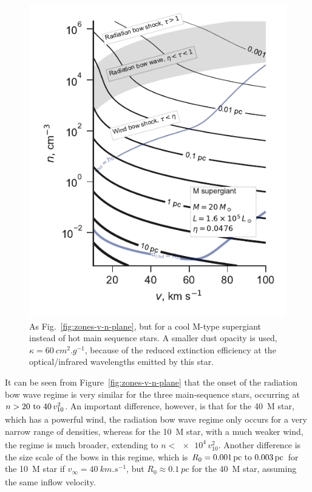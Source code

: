 \begin{figure}
  \includegraphics[width=\linewidth]{figs/zones-v-n-plane-RSG}
  \caption{As Fig.~\ref{fig:zones-v-n-plane}, but for a cool M-type
    supergiant instead of hot main sequence stars.  A smaller dust
    opacity is used, \(\kappa = \SI{60}{cm^2.g^{-1}}\), because of the
    reduced extinction efficiency at the optical/infrared wavelengths
    emitted by this star.}
  \label{fig:M-supergiant}
\end{figure}

It can be seen from Figure~\ref{fig:zones-v-n-plane} that the onset of
the radiation bow wave regime is very similar for the three
main-sequence stars, occurring at
\(n > \text{\numrange{20}{40}} \, v_{10}^2\).  An important
difference, however, is that for the \SI{40}{M_\odot} star, which has a
powerful wind, the radiation bow wave regime only occurs for a very
narrow range of densities, whereas for the \SI{10}{M_\odot} star, with a
much weaker wind, the regime is much broader, extending to
\(n < \num{e4} \, v_{10}^2\).  Another difference is the size scale of
the bows in this regime, which is
\(R_0 = \text{\SIrange{0.001}{0.003}{pc}}\) for the \SI{10}{M_\odot} star
if \(v_\infty = \SI{40}{km.s^{-1}}\), but \(R_0 \approx \SI{0.1}{pc}\) for the
\SI{40}{M_\odot} star, assuming the same inflow velocity.

